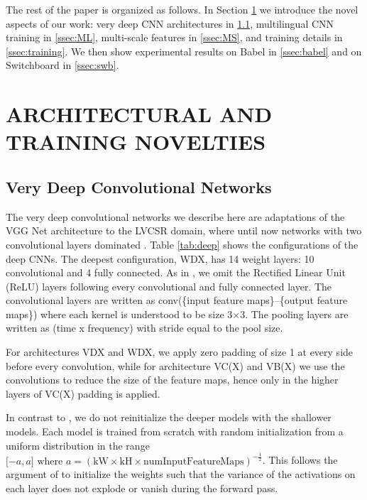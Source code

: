 \documentclass{article}
\begin{document}
The rest of the paper is organized as follows.
In Section \ref{sec:novelties} we introduce the novel aspects of our work:
very deep CNN architectures in \ref{ssec:deep}, multilingual CNN training in \ref{ssec:ML},
multi-scale features in \ref{ssec:MS}, and training details in \ref{ssec:training}.
We then show experimental results on Babel in \ref{ssec:babel} and on Switchboard in \ref{ssec:swb}.

\section{ARCHITECTURAL AND TRAINING NOVELTIES}
\label{sec:novelties}

\subsection{Very Deep Convolutional Networks}
\label{ssec:deep}
The very deep convolutional networks we describe here are adaptations of the VGG Net
architecture \cite{simonyan2014very} to the LVCSR domain, where until now
networks with two convolutional layers dominated \cite{sainath2013deep, soltau2014joint, saon2015ibm}.
Table \ref{tab:deep} shows the configurations of the deep CNNs.
The deepest configuration, WDX, has 14 weight layers: 10 convolutional and 4 fully connected.
As in \cite{simonyan2014very}, we omit the Rectified Linear Unit (ReLU) layers following
every convolutional and fully connected layer.
The convolutional layers are written as conv(\{input feature maps\}--\{output feature maps\}) where 
each kernel is understood to be size 3$\times$3.
The pooling layers are written as (time x frequency) with stride equal to the pool size.

For architectures VDX and WDX, we apply zero padding of size 1 at every side before every convolution,
while for architecture VC(X) and VB(X) we use the convolutions to reduce the size of the feature maps, 
hence only in the higher layers of VC(X) padding is applied.

In contrast to \cite{simonyan2014very}, we do not reinitialize the deeper models with the shallower models.
Each model is trained from scratch with random initialization from a uniform distribution in the range 
$\lbrack -a, a \rbrack \text{~where~} a = (\text{kW} \times \text{kH} \times \text{numInputFeatureMaps})^{-\frac{1}{2}}$.
This follows the argument of \cite{glorot2010understanding} to initialize the weights such that
the variance of the activations on each layer does not explode or vanish during the forward pass.
\end{document}
